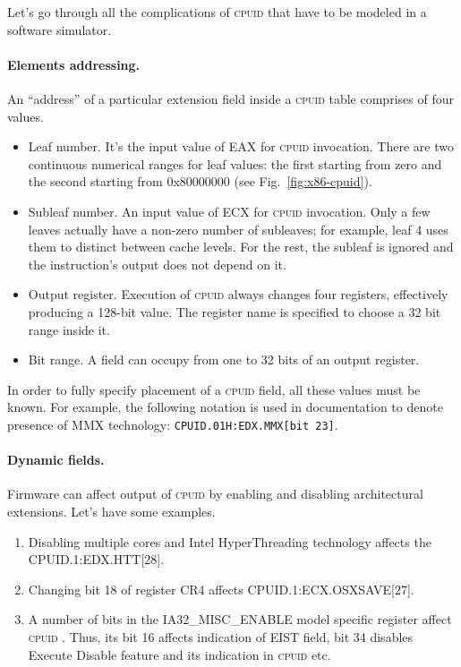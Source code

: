 \documentclass[a4paper,10pt,oneside,unicode]{article}
\newcommand{\cpuid}{\textsc{cpuid} }
\begin{document}
Let's go through all the complications of \cpuid that have to be modeled in a software simulator.

\paragraph{Elements addressing.} An “address” of a particular extension field inside a \cpuid table comprises of four values.

\begin{itemize}
\item Leaf number. It's the input value of EAX for \cpuid invocation. There are two continuous numerical ranges for leaf values: the first starting from zero and the second starting from 0x80000000 (see Fig.~\ref{fig:x86-cpuid}).
\item Subleaf number. An input value of ECX for \cpuid invocation. Only a few leaves actually have a non-zero number of subleaves; for example, leaf 4 uses them to distinct between cache levels. For the rest, the subleaf is ignored and the instruction's output does not depend on it.
\item Output register. Execution of \cpuid always changes four registers, effectively producing a 128-bit value. The register name is specified to choose a 32 bit range inside it.
\item Bit range. A field can occupy from one to 32 bits of an output register.
\end{itemize}

In order to fully specify placement of a \cpuid field, all these values must be known. For example, the following notation is used in documentation to denote presence of MMX technology: \texttt{CPUID.01H:EDX.MMX[bit 23]}.


\paragraph{Dynamic fields.} Firmware can affect output of \cpuid by enabling and disabling architectural extensions. Let's have some examples.
\begin{enumerate}
    \item Disabling multiple cores and Intel HyperThreading technology affects the CPUID.1:EDX.HTT[28].
    \item Changing bit 18 of register CR4 affects CPUID.1:ECX.OSXSAVE[27].
    \item A number of bits in the IA32\_MISC\_ENABLE model specific register affect \cpuid. Thus, its bit 16 affects indication of EIST field, bit 34 disables Execute Disable feature and its indication in \cpuid etc.
\end{enumerate}
\end{document}
